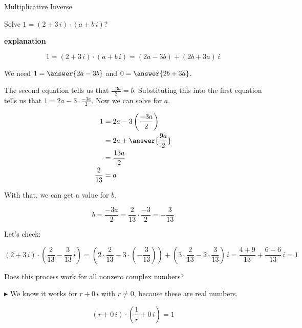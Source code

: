 \documentclass{ximera}
\begin{document}
\begin{example} Multiplicative Inverse


Solve $1 = (2 + 3 \, i) \cdot (a + b \, i)  $?


\textbf{\textcolor{red!75!green}{explanation}} 


\[   1 = (2 + 3 \, i) \cdot (a + b \, i)  =  (2a - 3b) + (2b+3a) \, i      \]






We need $1 = \answer{2a - 3b}$ and $0 = \answer{2b+3a}$.


The second  equation tells us that $\frac{-3a}{2} = b$.  Substituting this into the first equation tells us that $1 = 2a - 3 \cdot \frac{-3a}{2}$.  Now we can solve for $a$.



\begin{align*}
1     & = 2a - 3 \left( \frac{-3a}{2} \right)  \\
      & =   2a + \answer{\frac{9a}{2}}   \\
      & =    \frac{13a}{2}   \\
  \frac{2}{13}    & =  a
\end{align*}




With that, we can get a value for $b$.   


\[ b = \frac{-3a}{2} = \frac{2}{13}  \cdot \frac{-3}{2} = -\frac{3}{13} \]

Let's check:



\[    (2 + 3 \, i) \cdot \left(\frac{2}{13} - \frac{3}{13} \, i \right)     =   \left( 2 \cdot  \frac{2}{13} - 3 \cdot \left(- \frac{3}{13}\right)\right)  + \left( 3 \cdot \frac{2}{13} - 2 \cdot \frac{3}{13} \right) \, i = \frac{4+9}{13} + \frac{6-6}{13} \, i = 1  \]







\end{example}


Does this process work for all nonzero complex numbers? 





$\blacktriangleright$  We know it works for $r + 0 \, i$ with $r \ne 0$, because these are real numbers.


\[   (r + 0 \, i) \cdot \left(\frac{1}{r} + 0 \, i \right) = 1        \]
\end{document}
